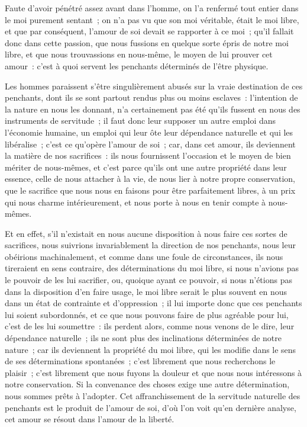 \documentclass[french,twoside]{book} %
\begin{document}
Faute d’avoir pénétré assez avant dans l’homme, on l’a renfermé tout entier dans le moi purement sentant ; on n’a pas vu que son moi véritable, était le moi libre, et que par conséquent, l’amour de soi devait se rapporter à ce moi ; qu’il fallait donc dans cette passion, que nous fussions en quelque sorte épris de notre moi libre, et que nous trouvassions en nous-même, le moyen de lui prouver cet amour : c’est à quoi servent les penchants déterminés de l’être physique.\par
Les hommes paraissent s’être singulièrement abusés sur la vraie destination de ces penchants, dont ils se sont partout rendus plus ou moins esclaves : l’intention de la nature en nous les donnant, n’a certainement pas été qu’ils fussent en nous des instruments de servitude ; il faut donc leur supposer un autre emploi dans l’économie humaine, un emploi qui leur ôte leur dépendance naturelle et qui les libéralise ; c’est ce qu’opère l’amour de soi ; car, dans cet amour, ils deviennent la matière de nos sacrifices : ils nous fournissent l’occasion et le moyen de bien mériter de nous-mêmes, et c’est parce qu’ils ont une autre propriété dans leur essence, celle de nous attacher à la vie, de nous lier à notre propre conservation, que le sacrifice que nous nous en faisons pour être parfaitement libres, à un prix qui nous charme intérieurement, et nous porte à nous en tenir compte à nous-mêmes.\par
Et en effet, s’il n’existait en nous aucune disposition à nous faire ces sortes de sacrifices, nous suivrions invariablement la direction de nos penchants, nous leur obéirions machinalement, et comme dans une foule de circonstances, ils nous tireraient en sens contraire, des déterminations du moi libre, si nous n’avions pas le pouvoir de les lui sacrifier, ou, quoique ayant ce pouvoir, si nous n’étions pas dans la disposition d’en faire usage, le moi libre serait le plus souvent en nous dans un état de contrainte et d’oppression ; il lui importe donc que ces penchants lui soient subordonnés, et ce que nous pouvons faire de plus agréable pour lui, c’est de les lui soumettre : ils perdent alors, comme nous venons de le dire, leur dépendance naturelle ; ils ne sont plus des inclinations déterminées de notre nature ; car ils deviennent la propriété du moi libre, qui les modifie dans le sens de ses déterminations spontanées ; c’est librement que nous recherchons le plaisir ; c’est librement que nous fuyons la douleur et que nous nous intéressons à notre conservation. Si la convenance des choses exige une autre détermination, nous sommes prêts à l’adopter. Cet affranchissement de la servitude naturelle des penchants est le produit de l’amour de soi, d’où l’on voit qu’en dernière analyse, cet amour se résout dans l’amour de la liberté.\par
\end{document}
